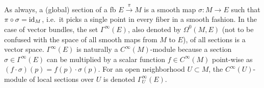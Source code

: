 \begin{defn}
    As always, a (global) section of a \gls{fb} $E\overset{\pi}{\to}M$ is a smooth map $\sigma:M\to E$ such that $\pi\circ \sigma=\operatorname{id}_M$, i.e.\ it picks a single point in every fiber in a smooth fashion. In the case of vector bundles, the set $\Gamma^\infty(E)$, also denoted by $\Omega^0(M,E)$ (not to be confused with the space of all smooth maps from $M$ to $E$), of all sections is a vector space. $\Gamma^\infty(E)$ is naturally a $C^\infty(M)$-module because a section $\sigma\in\Gamma^\infty(E)$ can be multiplied by a scalar function $f\in C^\infty(M)$ point-wise as $(f\cdot\sigma)(p)=f(p)\cdot\sigma(p)$. For an open neighborhood $U\subset M$, the $C^\infty(U)$-module of local sections over $U$ is denoted $\Gamma^\infty_U(E)$.
\end{defn}


